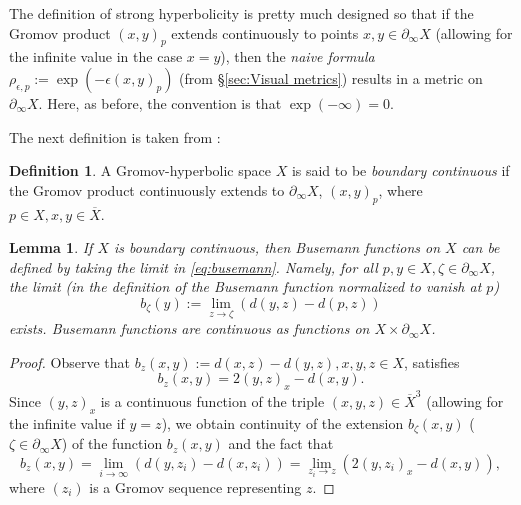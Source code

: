 \documentclass[12pt]{amsbook}%
\newtheorem{lem}[thm]{Lemma}
\theoremstyle{definition}
\newtheorem{defi}[thm]{Definition}
\theoremstyle{remark}
\numberwithin{section}{chapter}
\numberwithin{subsection}{section}
\numberwithin{figure}{chapter}
\def\eps{\epsilon}
\def\geo{\partial_\infty}
\def\ol{\overline}
\begin{document}
The definition of strong hyperbolicity is pretty much designed so that if the Gromov product $(x,y)_p$ extends continuously 
to points $x, y\in \geo X$ (allowing for the infinite value in the case $x=y$), then the {\em naive formula} $\rho_{\eps,p}:=\exp(-\epsilon (x, y)_p)$ (from 
\S \ref{sec:Visual metrics}) results in a metric on $\geo X$. Here, as before, the convention is that $\exp(-\infty)=0$. 

The next definition is taken from \cite{Buyalo-Schroeder}: 

\begin{defi}
A Gromov-hyperbolic space $X$ is said to be {\em boundary continuous} if the 
Gromov product continuously extends to $\geo X$, $(x,y)_p$, where $p\in X, x, y\in \ol{X}$.  
\end{defi}

\begin{lem}
If $X$ is boundary continuous, then Busemann functions on $X$ can be defined by taking the limit in \eqref{eq:busemann}. 
Namely, for all $p, y\in X, \zeta\in \geo X$, the limit (in the definition of the Busemann function normalized to vanish at $p$) 
$$
b_\zeta(y):= \lim_{z\to \zeta} (d(y, z)- d(p,z))
$$
exists. Busemann functions are continuous as functions on $X\times \geo X$. 
\end{lem}
\begin{proof} Observe that $b_z(x,y):=d(x,z)-d(y,z), x, y, z\in X$, satisfies  
$$ 
b_z(x,y)=2(y,z)_x - d(x,y).
$$
Since $(y,z)_x$ is a continuous function of the triple $(x,y,z)\in \ol{X}^3$ (allowing for the infinite value if $y=z$), 
we obtain continuity of the extension $b_\zeta(x,y)$ ($\zeta\in \geo X$) of the function $b_z(x,y)$ and the fact that 
$$
b_z(x,y)= \lim_{i\to\infty} (d(y,z_i) - d(x,z_i))= \lim_{z_i\to z} (2(y,z_i)_x - d(x,y)), 
$$
where $(z_i)$ is a Gromov sequence representing $z$.  
\end{proof}
\end{document}
